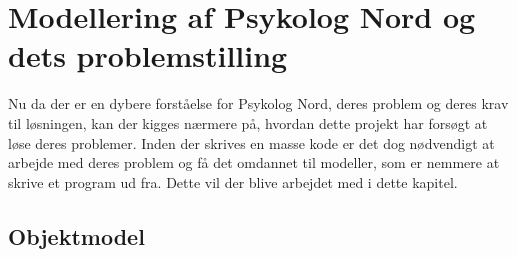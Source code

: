 \section{Modellering af Psykolog Nord og dets problemstilling}

Nu da der er en dybere forståelse for Psykolog Nord, deres problem og deres krav til løsningen, kan der kigges nærmere på, hvordan dette projekt har forsøgt at løse deres problemer.
Inden der skrives en masse kode er det dog nødvendigt at arbejde med deres problem og få det omdannet til modeller, som er nemmere at skrive et program ud fra.
Dette vil der blive arbejdet med i dette kapitel.

\subsection{Objektmodel}


